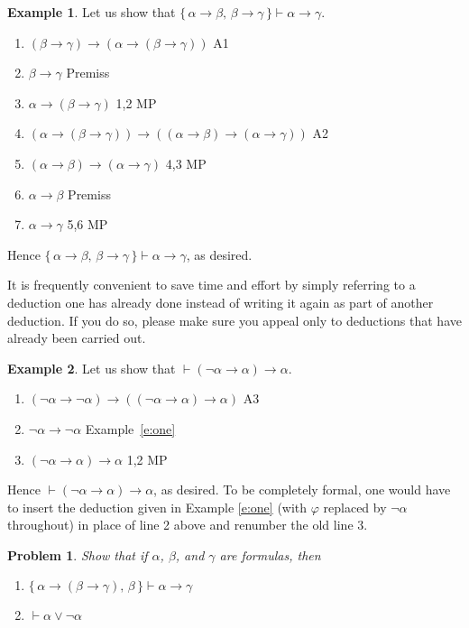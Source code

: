 \documentclass[12pt]{amsbook}
\newcommand{\proves}{\vdash}
\theoremstyle{plain}
\newtheorem{prob}[thm]{Problem}
\theoremstyle{definition}
\newtheorem{exmp}{Example}[chapter]
\theoremstyle{remark}
\begin{document}
\begin{exmp} \label{e:two}
Let us show that $\{\, \alpha \to \beta,\, \beta \to \gamma \,\} \proves \alpha \to \gamma$.  
\begin{enumerate}
\item $(\beta \to \gamma) \to (\alpha \to (\beta \to \gamma))$ \hfill A1
\item $\beta \to \gamma$ \hfill Premiss
\item $\alpha \to (\beta \to \gamma)$ \hfill 1,2 MP
\item $(\alpha \to (\beta \to \gamma)) \to ((\alpha \to \beta) \to (\alpha \to \gamma))$ \hfill A2
\item $(\alpha \to \beta) \to (\alpha \to \gamma)$ \hfill 4,3 MP
\item $\alpha \to \beta$ \hfill Premiss
\item $\alpha \to \gamma$ \hfill 5,6 MP
\end{enumerate}
Hence $\{\, \alpha \to \beta,\, \beta \to \gamma \,\} \proves \alpha \to \gamma$,  as desired.
\end{exmp}

It is frequently convenient to save time and effort by simply referring to a deduction one has already done instead of writing it again as part of another deduction.  If you do so,  please make sure you appeal only to deductions that have already been carried out.

\begin{exmp} \label{e:three}
Let us show that $\proves (\lnot \alpha \to \alpha) \to \alpha$.
\begin{enumerate}
\item $( \lnot \alpha \to \lnot \alpha) \to (( \lnot \alpha \to \alpha ) \to \alpha )$ \hfill A3
\item $\lnot\alpha \to \lnot\alpha$ \hfill Example~\ref{e:one}
\item $(\lnot \alpha \to \alpha) \to \alpha$ \hfill 1,2 MP
\end{enumerate}
Hence $\proves (\lnot \alpha \to \alpha) \to \alpha$,  as desired.  To be completely formal,  one would have to insert the deduction given in Example \ref{e:one} (with $\varphi$ replaced by $\lnot \alpha$ throughout) in place of line 2 above and renumber the old line 3.
\end{exmp}

\begin{prob} \label{p:ded}
Show that if $\alpha$,  $\beta$,  and $\gamma$ are formulas,  then
\begin{enumerate}
\item $\{\, \alpha \to (\beta \to \gamma),\, \beta\,\} \proves 
\alpha \to \gamma$
\item $\proves \alpha \lor \lnot \alpha$
\end{enumerate}
\end{prob}
\end{document}
